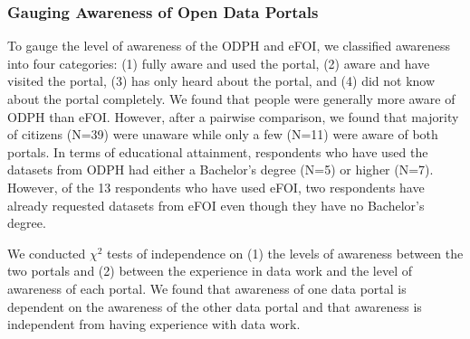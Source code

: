 \documentclass{sigchi}
\begin{document}
\subsubsection{Gauging Awareness of Open Data Portals}
To gauge the level of awareness of the ODPH and eFOI, we classified awareness into four categories: (1) fully aware and used the portal, (2) aware and have visited the portal, (3) has only heard about the portal, and (4) did not know about the portal completely. We found that people were generally more aware of ODPH than eFOI. However, after a pairwise comparison, we found that majority of citizens (N=39) were unaware while only a few (N=11) were aware of both portals. In terms of educational attainment, respondents who have used the datasets from ODPH had either a Bachelor's degree (N=5) or higher (N=7). However, of the 13 respondents who have used eFOI, two respondents have already requested datasets from eFOI even though they have no Bachelor's degree. 

We conducted $\chi^2$ tests of independence on (1) the levels of awareness between the two portals and (2) between the experience in data work and the level of awareness of each portal. We found that awareness of one data portal is dependent on the awareness of the other data portal and that awareness is independent from having experience with data work.

\end{document}

